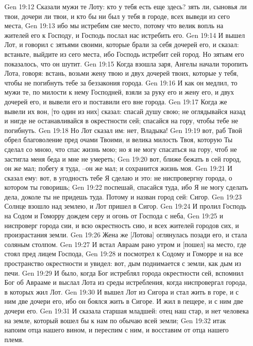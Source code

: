Gen 19:12  Сказали мужи те Лоту: кто у тебя есть еще здесь? зять ли, сыновья ли твои, дочери ли твои, и кто бы ни был у тебя в городе, всех выведи из сего места,
Gen 19:13  ибо мы истребим сие место, потому что велик вопль на жителей его к Господу, и Господь послал нас истребить его.
Gen 19:14  И вышел Лот, и говорил с зятьями своими, которые брали за себя дочерей его, и сказал: встаньте, выйдите из сего места, ибо Господь истребит сей город. Но зятьям его показалось, что он шутит.
Gen 19:15  Когда взошла заря, Ангелы начали торопить Лота, говоря: встань, возьми жену твою и двух дочерей твоих, которые у тебя, чтобы не погибнуть тебе за беззакония города.
Gen 19:16  И как он медлил, то мужи те, по милости к нему Господней, взяли за руку его и жену его, и двух дочерей его, и вывели его и поставили его вне города.
Gen 19:17  Когда же вывели их вон, [то один из них] сказал: спасай душу свою; не оглядывайся назад и нигде не останавливайся в окрестности сей; спасайся на гору, чтобы тебе не погибнуть.
Gen 19:18  Но Лот сказал им: нет, Владыка!
Gen 19:19  вот, раб Твой обрел благоволение пред очами Твоими, и велика милость Твоя, которую Ты сделал со мною, что спас жизнь мою; но я не могу спасаться на гору, чтоб не застигла меня беда и мне не умереть;
Gen 19:20  вот, ближе бежать в сей город, он же мал; побегу я туда, --он же мал; и сохранится жизнь моя.
Gen 19:21  И сказал ему: вот, в угодность тебе Я сделаю и это: не ниспровергну города, о котором ты говоришь;
Gen 19:22  поспешай, спасайся туда, ибо Я не могу сделать дела, доколе ты не придешь туда. Потому и назван город сей: Сигор.
Gen 19:23  Солнце взошло над землею, и Лот пришел в Сигор.
Gen 19:24  И пролил Господь на Содом и Гоморру дождем серу и огонь от Господа с неба,
Gen 19:25  и ниспроверг города сии, и всю окрестность сию, и всех жителей городов сих, и произрастания земли.
Gen 19:26  Жена же [Лотова] оглянулась позади его, и стала соляным столпом.
Gen 19:27  И встал Авраам рано утром и [пошел] на место, где стоял пред лицем Господа,
Gen 19:28  и посмотрел к Содому и Гоморре и на все пространство окрестности и увидел: вот, дым поднимается с земли, как дым из печи.
Gen 19:29  И было, когда Бог истреблял города окрестности сей, вспомнил Бог об Аврааме и выслал Лота из среды истребления, когда ниспровергал города, в которых жил Лот.
Gen 19:30  И вышел Лот из Сигора и стал жить в горе, и с ним две дочери его, ибо он боялся жить в Сигоре. И жил в пещере, и с ним две дочери его.
Gen 19:31  И сказала старшая младшей: отец наш стар, и нет человека на земле, который вошел бы к нам по обычаю всей земли;
Gen 19:32  итак напоим отца нашего вином, и переспим с ним, и восставим от отца нашего племя.
